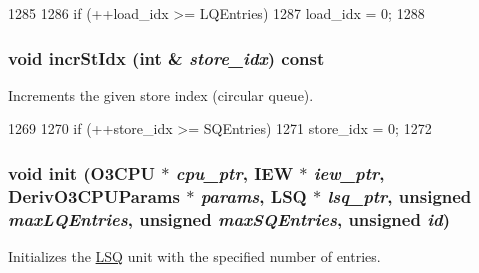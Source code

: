 \begin{DoxyCode}
1285 {
1286     if (++load_idx >= LQEntries)
1287         load_idx = 0;
1288 }
\end{DoxyCode}
\hypertarget{classLSQUnit_a7576fc9eec69e3ce28ce7af7ad87416a}{
\subsubsection[{incrStIdx}]{\setlength{\rightskip}{0pt plus 5cm}void incrStIdx (int \& {\em store\_\-idx}) const}}
\label{classLSQUnit_a7576fc9eec69e3ce28ce7af7ad87416a}
Increments the given store index (circular queue). 


\begin{DoxyCode}
1269 {
1270     if (++store_idx >= SQEntries)
1271         store_idx = 0;
1272 }
\end{DoxyCode}
\hypertarget{classLSQUnit_a45b3b65ba551c17c3b200db265611a4c}{
\subsubsection[{init}]{\setlength{\rightskip}{0pt plus 5cm}void init ({\bf O3CPU} $\ast$ {\em cpu\_\-ptr}, \/  {\bf IEW} $\ast$ {\em iew\_\-ptr}, \/  DerivO3CPUParams $\ast$ {\em params}, \/  {\bf LSQ} $\ast$ {\em lsq\_\-ptr}, \/  unsigned {\em maxLQEntries}, \/  unsigned {\em maxSQEntries}, \/  unsigned {\em id})}}
\label{classLSQUnit_a45b3b65ba551c17c3b200db265611a4c}
Initializes the \hyperlink{classLSQ}{LSQ} unit with the specified number of entries. 


